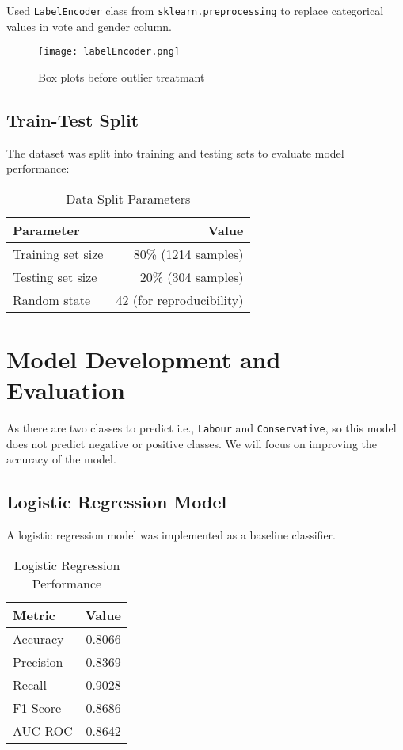 \documentclass[12pt]{article}
\begin{document}
Used \texttt{LabelEncoder} class from \texttt{sklearn.preprocessing} to replace categorical values in vote and gender column.

\begin{figure}[H]
    \centering
    \texttt{[image: labelEncoder.png]}
    \caption{Box plots before outlier treatmant }
    \label{fig:example}
\end{figure}

\subsection{Train-Test Split}
The dataset was split into training and testing sets to evaluate model performance:

\begin{table}[H]
\centering
\caption{Data Split Parameters}
\label{tab:data_split}
\begin{tabular}{lr}
\toprule
\textbf{Parameter} & \textbf{Value} \\
\midrule
Training set size & 80\% (1214 samples) \\
Testing set size & 20\% (304 samples) \\
Random state & 42 (for reproducibility) \\
\bottomrule
\end{tabular}
\end{table}

\section{Model Development and Evaluation}

As there are two classes to predict i.e., \texttt{Labour} and \texttt{Conservative}, so this model does not predict negative or positive classes. We will focus on improving the accuracy of the model.

\subsection{Logistic Regression Model}
A logistic regression model was implemented as a baseline classifier.

\begin{table}[H]
\centering
\caption{Logistic Regression Performance}
\label{tab:logistic_perf}
\begin{tabular}{lr}
\toprule
\textbf{Metric} & \textbf{Value} \\
\midrule
Accuracy & 0.8066 \\
Precision & 0.8369 \\
Recall & 0.9028 \\
F1-Score & 0.8686 \\
AUC-ROC & 0.8642 \\
\bottomrule
\end{tabular}
\end{table}
\end{document}
